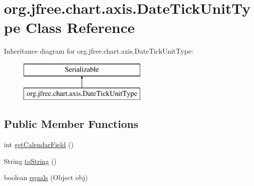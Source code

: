 \hypertarget{classorg_1_1jfree_1_1chart_1_1axis_1_1_date_tick_unit_type}{}\section{org.\+jfree.\+chart.\+axis.\+Date\+Tick\+Unit\+Type Class Reference}
\label{classorg_1_1jfree_1_1chart_1_1axis_1_1_date_tick_unit_type}
Inheritance diagram for org.\+jfree.\+chart.\+axis.\+Date\+Tick\+Unit\+Type\+:\begin{figure}[H]
\begin{center}
\leavevmode
\includegraphics[height=2.000000cm]{classorg_1_1jfree_1_1chart_1_1axis_1_1_date_tick_unit_type}
\end{center}
\end{figure}
\subsection*{Public Member Functions}
\begin{DoxyCompactItemize}
\item 
int \mbox{\hyperlink{classorg_1_1jfree_1_1chart_1_1axis_1_1_date_tick_unit_type_a057a476af3e304d26aed22f47d6d1e90}{get\+Calendar\+Field}} ()
\item 
String \mbox{\hyperlink{classorg_1_1jfree_1_1chart_1_1axis_1_1_date_tick_unit_type_ad2519e99ba569edeaf00ca277ba7e8ab}{to\+String}} ()
\item 
boolean \mbox{\hyperlink{classorg_1_1jfree_1_1chart_1_1axis_1_1_date_tick_unit_type_adcf077c51b07ccffe808b2dd7df1779a}{equals}} (Object obj)
\end{DoxyCompactItemize}
